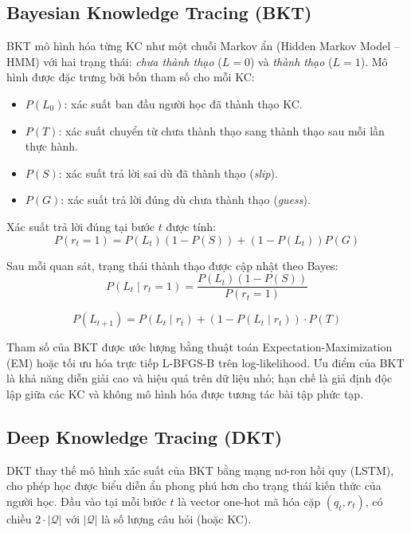 \documentclass[12pt, a4paper]{report}
\begin{document}
\subsection{Bayesian Knowledge Tracing (BKT)}
\label{subsec:bkt}

BKT \cite{corbett1994knowledge} mô hình hóa từng KC như một chuỗi Markov ẩn (Hidden Markov Model -- HMM) với hai trạng thái: \textit{chưa thành thạo} ($L=0$) và \textit{thành thạo} ($L=1$). Mô hình được đặc trưng bởi bốn tham số cho mỗi KC:

\begin{itemize}
  \item $P(L_0)$: xác suất ban đầu người học đã thành thạo KC.
  \item $P(T)$: xác suất chuyển từ chưa thành thạo sang thành thạo sau mỗi lần thực hành.
  \item $P(S)$: xác suất trả lời sai dù đã thành thạo (\textit{slip}).
  \item $P(G)$: xác suất trả lời đúng dù chưa thành thạo (\textit{guess}).
\end{itemize}

Xác suất trả lời đúng tại bước $t$ được tính:
\begin{equation}
  P(r_t = 1) = P(L_t)(1 - P(S)) + (1 - P(L_t))P(G)
\end{equation}

Sau mỗi quan sát, trạng thái thành thạo được cập nhật theo Bayes:
\begin{equation}
  P(L_t \mid r_t = 1) = \frac{P(L_t)(1 - P(S))}{P(r_t = 1)}
\end{equation}

\begin{equation}
  P(L_{t+1}) = P(L_t \mid r_t) + (1 - P(L_t \mid r_t)) \cdot P(T)
\end{equation}

Tham số của BKT được ước lượng bằng thuật toán Expectation-Maximization (EM) hoặc tối ưu hóa trực tiếp L-BFGS-B trên log-likelihood. Ưu điểm của BKT là khả năng diễn giải cao và hiệu quả trên dữ liệu nhỏ; hạn chế là giả định độc lập giữa các KC và không mô hình hóa được tương tác bài tập phức tạp.

\subsection{Deep Knowledge Tracing (DKT)}
\label{subsec:dkt}

DKT \cite{piech2015deep} thay thế mô hình xác suất của BKT bằng mạng nơ-ron hồi quy (LSTM), cho phép học được biểu diễn ẩn phong phú hơn cho trạng thái kiến thức của người học. Đầu vào tại mỗi bước $t$ là vector one-hot mã hóa cặp $(q_t, r_t)$, có chiều $2 \cdot |\mathcal{Q}|$ với $|\mathcal{Q}|$ là số lượng câu hỏi (hoặc KC).
\end{document}
